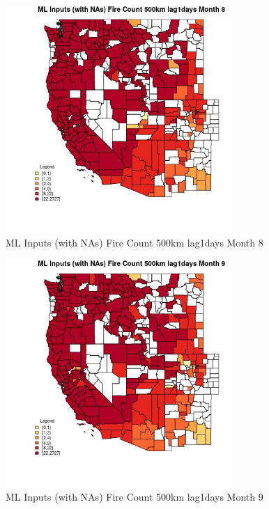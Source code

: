 \begin{figure} 
\centering  
\includegraphics[width=0.77\textwidth]{Code_Outputs/Report_ML_input_PM25_Step4_part_f_de_duplicated_aveswNAs_CountyFire_Count_500km_lag1daysmedianMonth8.jpg} 
\caption{\label{fig:Report_ML_input_PM25_Step4_part_f_de_duplicated_aveswNAsCountyFire_Count_500km_lag1daysmedianMonth8}ML Inputs (with NAs) Fire Count 500km lag1days Month 8} 
\end{figure} 
 

\begin{figure} 
\centering  
\includegraphics[width=0.77\textwidth]{Code_Outputs/Report_ML_input_PM25_Step4_part_f_de_duplicated_aveswNAs_CountyFire_Count_500km_lag1daysmedianMonth9.jpg} 
\caption{\label{fig:Report_ML_input_PM25_Step4_part_f_de_duplicated_aveswNAsCountyFire_Count_500km_lag1daysmedianMonth9}ML Inputs (with NAs) Fire Count 500km lag1days Month 9} 
\end{figure} 
 

